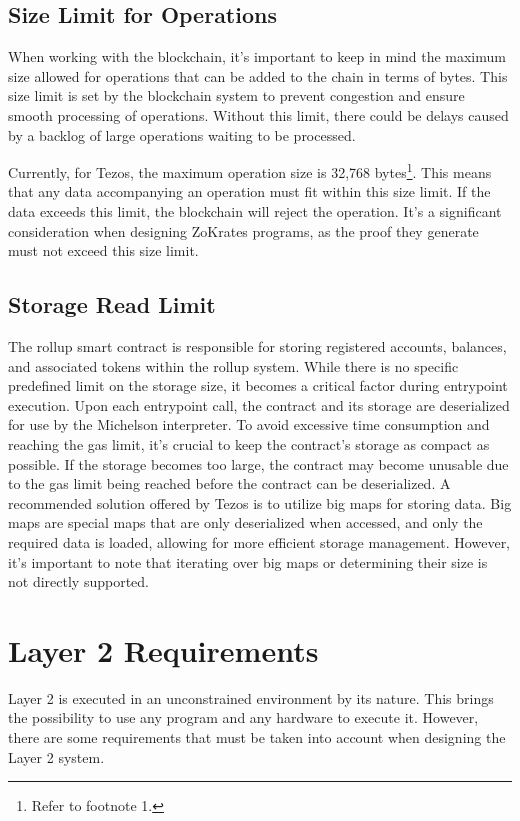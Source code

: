 \subsection{Size Limit for Operations}

When working with the blockchain, it's important to keep in mind the maximum size allowed for operations that can be added to the chain in terms of bytes. This size limit is set by the blockchain system to prevent congestion and ensure smooth processing of operations. Without this limit, there could be delays caused by a backlog of large operations waiting to be processed.

Currently, for Tezos, the maximum operation size is 32,768 bytes\footnote{Refer to footnote 1.}. This means that any data accompanying an operation must fit within this size limit. If the data exceeds this limit, the blockchain will reject the operation. It's a significant consideration when designing ZoKrates programs, as the proof they generate must not exceed this size limit.

\subsection{Storage Read Limit}

The rollup smart contract is responsible for storing registered accounts, balances, and associated tokens within the rollup system. While there is no specific predefined limit on the storage size, it becomes a critical factor during entrypoint execution. Upon each entrypoint call, the contract and its storage are deserialized for use by the Michelson interpreter. To avoid excessive time consumption and reaching the gas limit, it's crucial to keep the contract's storage as compact as possible. If the storage becomes too large, the contract may become unusable due to the gas limit being reached before the contract can be deserialized. A recommended solution offered by Tezos is to utilize big maps for storing data. Big maps are special maps that are only deserialized when accessed, and only the required data is loaded, allowing for more efficient storage management. However, it's important to note that iterating over big maps or determining their size is not directly supported.

\section{Layer 2 Requirements}

Layer 2 is executed in an unconstrained environment by its nature. This brings the possibility to use any program and any hardware to execute it. However, there are some requirements that must be taken into account when designing the Layer 2 system.

